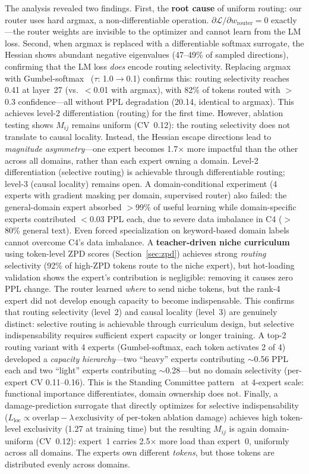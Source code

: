 \documentclass{article}
\begin{document}
The analysis revealed two findings. First, the \textbf{root cause} of uniform
routing: our router uses hard argmax, a non-differentiable operation.
$\partial\mathcal{L}/\partial w_{\text{router}} = 0$ exactly---the router
weights are invisible to the optimizer and cannot learn from the LM loss.
Second, when argmax is replaced with a differentiable softmax surrogate, the
Hessian shows abundant negative eigenvalues (47--49\% of sampled directions),
confirming that the LM loss \emph{does} encode routing selectivity. Replacing argmax with
Gumbel-softmax~\cite{jang2017gumbel} ($\tau$: 1.0$\to$0.1) confirms this:
routing selectivity reaches 0.41 at layer~27 (vs.\ $<$0.01 with argmax),
with 82\% of tokens routed with $>$0.3 confidence---all without PPL
degradation (20.14, identical to argmax). This achieves level-2
differentiation (routing) for the first time. However, ablation testing shows
$M_{ij}$ remains uniform (CV~0.12): the routing selectivity does not translate
to causal locality. Instead, the Hessian escape directions lead to
\emph{magnitude asymmetry}---one expert becomes 1.7$\times$ more impactful
than the other across all domains, rather than each expert owning a domain.
Level-2 differentiation (selective routing) is achievable through
differentiable routing; level-3 (causal locality) remains open. A
domain-conditional experiment (4 experts with gradient masking per domain,
supervised router) also failed: the general-domain expert absorbed
$>$99\% of useful learning while domain-specific experts contributed
$<$0.03 PPL each, due to severe data imbalance in C4 ($>$80\% general text).
Even forced specialization on keyword-based domain labels cannot overcome
C4's data imbalance. A \textbf{teacher-driven niche curriculum}
using token-level ZPD scores (Section~\ref{sec:zpd}) achieves strong
\emph{routing} selectivity (92\% of high-ZPD tokens route to the niche
expert), but hot-loading validation shows the expert's contribution is
negligible: removing it causes zero PPL change. The router learned
\emph{where} to send niche tokens, but the rank-4 expert did not develop
enough capacity to become indispensable. This confirms that routing
selectivity (level~2) and causal locality (level~3) are genuinely
distinct: selective routing is achievable through curriculum design, but
selective indispensability requires sufficient expert capacity or longer
training. A top-2 routing variant
with 4 experts (Gumbel-softmax, each token activates 2 of 4) developed a
\emph{capacity hierarchy}---two ``heavy'' experts contributing $\sim$0.56 PPL
each and two ``light'' experts contributing $\sim$0.28---but no domain
selectivity (per-expert CV 0.11--0.16). This is the Standing Committee
pattern~\cite{standing2026} at 4-expert scale: functional importance
differentiates, domain ownership does not. Finally, a damage-prediction
surrogate that directly optimizes for selective indispensability
($L_\text{loc} \propto \text{overlap} - \lambda\,\text{exclusivity}$
of per-token ablation damage) achieves high token-level exclusivity
(1.27 at training time) but the resulting $M_{ij}$ is again
domain-uniform (CV~0.12): expert~1 carries 2.5$\times$ more load than
expert~0, uniformly across all domains. The experts own different
\emph{tokens}, but those tokens are distributed evenly across domains.
\end{document}
